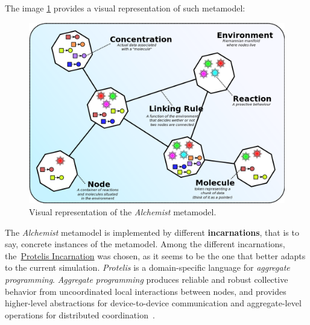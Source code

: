 \noindent
The image \ref{fig:model} provides a visual representation of such metamodel:
\begin{figure}[H]
    \centering
    \includegraphics[width=.8\textwidth]{../img/model}
    \caption{Visual representation of the \textit{Alchemist} metamodel.}
    \label{fig:model}
\end{figure}

\noindent
The \textit{Alchemist} metamodel is implemented by different \textbf{incarnations}, that is to say, concrete instances of the metamodel.
Among the different incarnations, the~\href{https://protelis.github.io/}{Protelis Incarnation} was chosen, as it seems to be the one that better adapts to the current simulation.
\textit{Protelis} is a domain-specific language for \textit{aggregate programming}. \textit{Aggregate programming} produces reliable and robust collective behavior from uncoordinated local interactions between nodes, and provides higher-level abstractions for device-to-device communication and aggregate-level operations for distributed coordination~\cite{protelis}.
